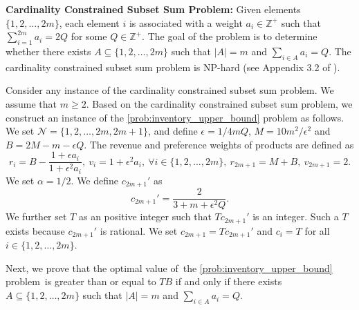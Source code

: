 \documentclass[mnsc,non-blindrev]{informs3}
\theoremstyle{definition}
\begin{document}
\begin{appendices}{\Large{}}
\noindent\textbf{Cardinality Constrained Subset Sum Problem:} Given elements $\{1,2,\dots,2m\}$, each element $i$ is associated with a weight $a_i\in\mathbb{Z}^+$ such that $\sum_{i=1}^{2m}a_i=2Q$ for some $Q\in\mathbb{Z}^+$. The goal of the problem is to determine whether there exists $A\subseteq\{1,2,\dots,2m\}$ such that $|A|=m$ and $\sum_{i\in A}a_i=Q$. The cardinality constrained subset sum problem is NP-hard (see Appendix 3.2 of \citealt{garey1979computers}).

Consider any instance of the cardinality constrained subset sum problem. We assume that $m\geq 2$. Based on the cardinality constrained subset sum problem, we construct an instance of the \ref{prob:inventory_upper_bound} problem as follows. We set $\mathcal{N}=\{1,2,\dots,2m,2m+1\}$, and define $\epsilon=1/4mQ$, $M=10m^2/\epsilon^2$ and $B=2M-m-\epsilon Q$. The revenue and preference weights of products are defined as
\begin{equation*}
r_i=B-\dfrac{1+\epsilon a_i}{1+\epsilon^2 a_i},\ v_i=1+\epsilon^2 a_i,\ \forall i\in\{1,2,\dots,2m\},\ r_{2m+1}=M+B,\ v_{2m+1}=2.
\end{equation*}
We set $\alpha=1/2$. We define $c_{2m+1}'$ as
\begin{equation*}
c_{2m+1}'=\dfrac{2}{3+m+\epsilon^2Q}.
\end{equation*}
We further set $T$ as an positive integer such that $Tc_{2m+1}'$ is an integer. Such a $T$ exists because $c_{2m+1}'$ is rational. We set $c_{2m+1}=Tc_{2m+1}'$ and $c_i=T$ for all $i\in\{1,2,\dots,2m\}$.

Next, we prove that the optimal value of~the \ref{prob:inventory_upper_bound} problem~is greater than or equal to $TB$ if and only if there exists $A\subseteq\{1,2,\dots,2m\}$ such that $|A|=m$ and $\sum_{i\in A}a_i=Q$.


\end{appendices}
\end{document}

